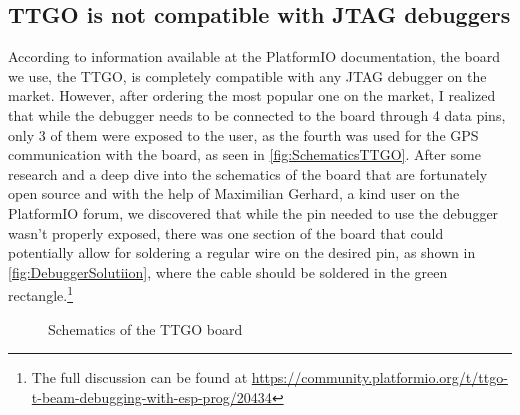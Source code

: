 \subsection{TTGO is not compatible with JTAG debuggers}
According to information available at the PlatformIO documentation, the board we use, the TTGO, is completely compatible with any JTAG debugger on the market. However, after ordering the most popular one on the market, I realized that while the debugger needs to be connected to the board through 4 data pins, only 3 of them were exposed to the user, as the fourth was used for the GPS communication with the board, as seen in \autoref{fig:SchematicsTTGO}. After some research and a deep dive into the schematics of the board that are fortunately open source and with the help of Maximilian Gerhard, a kind user on the PlatformIO forum, we discovered that while the pin needed to use the debugger wasn't properly exposed, there was one section of the board that could potentially allow for soldering a regular wire on the desired pin, as shown in \autoref{fig:DebuggerSolutiion}, where the cable should be soldered in the green rectangle.\footnote{The full discussion can be found at \url{https://community.platformio.org/t/ttgo-t-beam-debugging-with-esp-prog/20434}}
\begin{figure}[h!]
    \centering
    \advance\leftskip-4cm
    \advance\rightskip-4cm
    \qquad
    \caption{Schematics of the TTGO board \cite{TTGOSchematics}}%
    \label{fig:SchematicsTTGO}%
\end{figure}

